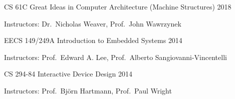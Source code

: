 
\begin{cvhonors}

  \cvhonor
  {CS 61C}
  {Great Ideas in Computer Architecture (Machine Structures)}
  {}
  {2018}

  \cvsubhonor
  {Instructors: Dr.~Nicholas Weaver, Prof.~John Wawrzynek}
  
  \cvhonor
  {EECS 149/249A}
  {Introduction to Embedded Systems}
  {}
  {2014}

  \cvsubhonor
  {Instructors: Prof.~Edward A. Lee, Prof.~Alberto Sangiovanni-Vincentelli}
  
  \cvhonor
  {CS 294-84}
  {Interactive Device Design}
  {}
  {2014}

  \cvsubhonor
  {Instructors: Prof.~Bj\"orn Hartmann, Prof.~Paul Wright}
  
\end{cvhonors}

